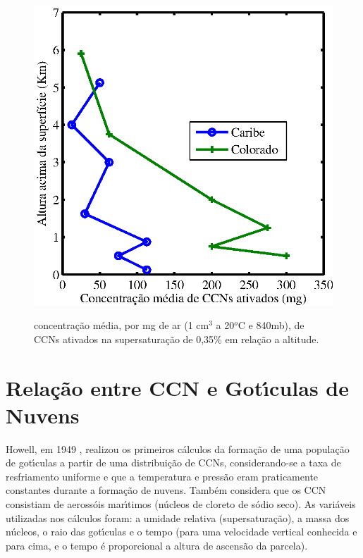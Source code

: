 \begin{figure}[!hbt]
\begin{center}
\includegraphics[scale=1.0]{eps/medidasAero2.eps}\\
\end{center}
\caption{\label{medidasAero}\hspace{-0.1em} concentra\c{c}\~{a}o m\'{e}dia, por mg de ar (1 cm$^3$ a 20$^o$C e 840mb), de CCNs ativados na supersatura\c{c}\~{a}o de 0,35\% em rela\c{c}\~{a}o a altitude.}
\end{figure}

\section{Rela\c{c}\~{a}o entre CCN e Got\'{\i}culas de Nuvens}
Howell, em 1949 \cite{Howell}, realizou os primeiros c\'{a}lculos da forma\c{c}\~{a}o de uma popula\c{c}\~{a}o de got\'{\i}culas a partir de uma distribui\c{c}\~{a}o de CCNs, considerando-se a taxa de resfriamento uniforme e que a temperatura e press\~{a}o eram praticamente constantes durante a forma\c{c}\~{a}o de nuvens. Tamb\'{e}m considera que os CCN consistiam de aeross\'{o}is mar\'{\i}timos (n\'{u}cleos de cloreto de s\'{o}dio seco). As vari\'{a}veis utilizadas nos c\'{a}lculos foram: a umidade relativa (supersatura\c{c}\~{a}o), a massa dos n\'{u}cleos, o raio das got\'{\i}culas e o tempo (para uma velocidade vertical conhecida e para cima, e o tempo \'{e} proporcional a altura de ascens\~{a}o da parcela).

